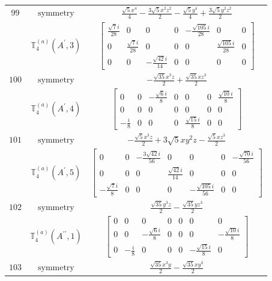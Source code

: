 \documentclass[fleqn,8pt,landscape]{jsarticle}
\begin{document}
\begin{longtable}{ccc}
$ 99 $ & $ \text{symmetry} $ & $ \frac{\sqrt{5} x^{4}}{4} - \frac{3 \sqrt{5} x^{2} z^{2}}{2} - \frac{\sqrt{5} y^{4}}{4} + \frac{3 \sqrt{5} y^{2} z^{2}}{2} $ \\
$  $ & $ \mathbb{T}_{4}^{(a)}(A^{\prime},3) $ & $ \begin{bmatrix} \frac{\sqrt{7} i}{28} & 0 & 0 & 0 & - \frac{\sqrt{105} i}{28} & 0 & 0 \\ 0 & \frac{\sqrt{7} i}{28} & 0 & 0 & 0 & \frac{\sqrt{105} i}{28} & 0 \\ 0 & 0 & - \frac{\sqrt{42} i}{14} & 0 & 0 & 0 & 0 \end{bmatrix} $ \\ \hline
$ 100 $ & $ \text{symmetry} $ & $ - \frac{\sqrt{35} x^{3} z}{2} + \frac{\sqrt{35} x z^{3}}{2} $ \\
$  $ & $ \mathbb{T}_{4}^{(a)}(A^{\prime},4) $ & $ \begin{bmatrix} 0 & 0 & - \frac{\sqrt{6} i}{8} & 0 & 0 & 0 & \frac{\sqrt{10} i}{8} \\ 0 & 0 & 0 & 0 & 0 & 0 & 0 \\ - \frac{i}{8} & 0 & 0 & 0 & \frac{\sqrt{15} i}{8} & 0 & 0 \end{bmatrix} $ \\ \hline
$ 101 $ & $ \text{symmetry} $ & $ - \frac{\sqrt{5} x^{3} z}{2} + 3 \sqrt{5} x y^{2} z - \frac{\sqrt{5} x z^{3}}{2} $ \\
$  $ & $ \mathbb{T}_{4}^{(a)}(A^{\prime},5) $ & $ \begin{bmatrix} 0 & 0 & - \frac{3 \sqrt{42} i}{56} & 0 & 0 & 0 & - \frac{\sqrt{70} i}{56} \\ 0 & 0 & 0 & \frac{\sqrt{42} i}{14} & 0 & 0 & 0 \\ - \frac{\sqrt{7} i}{8} & 0 & 0 & 0 & - \frac{\sqrt{105} i}{56} & 0 & 0 \end{bmatrix} $ \\ \hline
$ 102 $ & $ \text{symmetry} $ & $ \frac{\sqrt{35} y^{3} z}{2} - \frac{\sqrt{35} y z^{3}}{2} $ \\
$  $ & $ \mathbb{T}_{4}^{(a)}(A^{\prime\prime},1) $ & $ \begin{bmatrix} 0 & 0 & 0 & 0 & 0 & 0 & 0 \\ 0 & 0 & - \frac{\sqrt{6} i}{8} & 0 & 0 & 0 & - \frac{\sqrt{10} i}{8} \\ 0 & - \frac{i}{8} & 0 & 0 & 0 & - \frac{\sqrt{15} i}{8} & 0 \end{bmatrix} $ \\ \hline
$ 103 $ & $ \text{symmetry} $ & $ \frac{\sqrt{35} x^{3} y}{2} - \frac{\sqrt{35} x y^{3}}{2} $ \\

\end{longtable}
\end{document}
